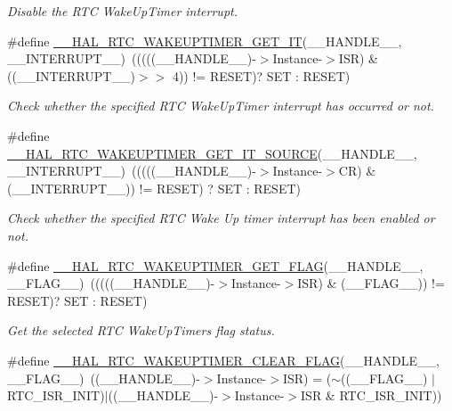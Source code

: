 \begin{DoxyCompactItemize}
\begin{DoxyCompactList}\small\item\em Disable the R\+TC Wake\+Up\+Timer interrupt. \end{DoxyCompactList}\item 
\#define \hyperlink{group___r_t_c_ex___wake_up___timer_gaac6051af0e8efabdae50b7051554355b}{\+\_\+\+\_\+\+H\+A\+L\+\_\+\+R\+T\+C\+\_\+\+W\+A\+K\+E\+U\+P\+T\+I\+M\+E\+R\+\_\+\+G\+E\+T\+\_\+\+IT}(\+\_\+\+\_\+\+H\+A\+N\+D\+L\+E\+\_\+\+\_\+,  \+\_\+\+\_\+\+I\+N\+T\+E\+R\+R\+U\+P\+T\+\_\+\+\_\+)~(((((\+\_\+\+\_\+\+H\+A\+N\+D\+L\+E\+\_\+\+\_\+)-\/$>$Instance-\/$>$I\+SR) \& ((\+\_\+\+\_\+\+I\+N\+T\+E\+R\+R\+U\+P\+T\+\_\+\+\_\+)$>$$>$ 4)) != R\+E\+S\+ET)? S\+ET \+: R\+E\+S\+ET)
\begin{DoxyCompactList}\small\item\em Check whether the specified R\+TC Wake\+Up\+Timer interrupt has occurred or not. \end{DoxyCompactList}\item 
\#define \hyperlink{group___r_t_c_ex___wake_up___timer_gafbe296c7719885437a245d5967194ac0}{\+\_\+\+\_\+\+H\+A\+L\+\_\+\+R\+T\+C\+\_\+\+W\+A\+K\+E\+U\+P\+T\+I\+M\+E\+R\+\_\+\+G\+E\+T\+\_\+\+I\+T\+\_\+\+S\+O\+U\+R\+CE}(\+\_\+\+\_\+\+H\+A\+N\+D\+L\+E\+\_\+\+\_\+,  \+\_\+\+\_\+\+I\+N\+T\+E\+R\+R\+U\+P\+T\+\_\+\+\_\+)~(((((\+\_\+\+\_\+\+H\+A\+N\+D\+L\+E\+\_\+\+\_\+)-\/$>$Instance-\/$>$CR) \& (\+\_\+\+\_\+\+I\+N\+T\+E\+R\+R\+U\+P\+T\+\_\+\+\_\+)) != R\+E\+S\+ET) ? S\+ET \+: R\+E\+S\+ET)
\begin{DoxyCompactList}\small\item\em Check whether the specified R\+TC Wake Up timer interrupt has been enabled or not. \end{DoxyCompactList}\item 
\#define \hyperlink{group___r_t_c_ex___wake_up___timer_ga217666f5b1e27e24441e2e9a3b51f28e}{\+\_\+\+\_\+\+H\+A\+L\+\_\+\+R\+T\+C\+\_\+\+W\+A\+K\+E\+U\+P\+T\+I\+M\+E\+R\+\_\+\+G\+E\+T\+\_\+\+F\+L\+AG}(\+\_\+\+\_\+\+H\+A\+N\+D\+L\+E\+\_\+\+\_\+,  \+\_\+\+\_\+\+F\+L\+A\+G\+\_\+\+\_\+)~(((((\+\_\+\+\_\+\+H\+A\+N\+D\+L\+E\+\_\+\+\_\+)-\/$>$Instance-\/$>$I\+SR) \& (\+\_\+\+\_\+\+F\+L\+A\+G\+\_\+\+\_\+)) != R\+E\+S\+ET)? S\+ET \+: R\+E\+S\+ET)
\begin{DoxyCompactList}\small\item\em Get the selected R\+TC Wake\+Up\+Timer\textquotesingle{}s flag status. \end{DoxyCompactList}\item 
\#define \hyperlink{group___r_t_c_ex___wake_up___timer_gabb56cd29b62b414c5da34e2fc1cabf16}{\+\_\+\+\_\+\+H\+A\+L\+\_\+\+R\+T\+C\+\_\+\+W\+A\+K\+E\+U\+P\+T\+I\+M\+E\+R\+\_\+\+C\+L\+E\+A\+R\+\_\+\+F\+L\+AG}(\+\_\+\+\_\+\+H\+A\+N\+D\+L\+E\+\_\+\+\_\+,  \+\_\+\+\_\+\+F\+L\+A\+G\+\_\+\+\_\+)~((\+\_\+\+\_\+\+H\+A\+N\+D\+L\+E\+\_\+\+\_\+)-\/$>$Instance-\/$>$I\+SR) = ($\sim$((\+\_\+\+\_\+\+F\+L\+A\+G\+\_\+\+\_\+) $\vert$ R\+T\+C\+\_\+\+I\+S\+R\+\_\+\+I\+N\+IT)$\vert$((\+\_\+\+\_\+\+H\+A\+N\+D\+L\+E\+\_\+\+\_\+)-\/$>$Instance-\/$>$I\+SR \& R\+T\+C\+\_\+\+I\+S\+R\+\_\+\+I\+N\+IT))
$$
\end{DoxyCompactItemize}
